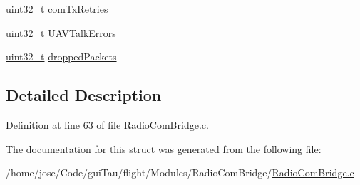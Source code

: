 \begin{DoxyCompactItemize}
\item 
\hyperlink{stdint_8h_a435d1572bf3f880d55459d9805097f62}{uint32\-\_\-t} \hyperlink{group___radio_com_bridge_module_ga392e64420cac274586464b5173287ddd}{com\-Tx\-Retries}
\item 
\hyperlink{stdint_8h_a435d1572bf3f880d55459d9805097f62}{uint32\-\_\-t} \hyperlink{group___radio_com_bridge_module_ga1c4163b0b99110e783fba534b15458c1}{U\-A\-V\-Talk\-Errors}
\item 
\hyperlink{stdint_8h_a435d1572bf3f880d55459d9805097f62}{uint32\-\_\-t} \hyperlink{group___radio_com_bridge_module_gafe94f8af161cf4629a276387f1b0bca6}{dropped\-Packets}
\end{DoxyCompactItemize}


\subsection{Detailed Description}


Definition at line 63 of file Radio\-Com\-Bridge.\-c.



The documentation for this struct was generated from the following file\-:\begin{DoxyCompactItemize}
\item 
/home/jose/\-Code/gui\-Tau/flight/\-Modules/\-Radio\-Com\-Bridge/\hyperlink{_radio_com_bridge_8c}{Radio\-Com\-Bridge.\-c}\end{DoxyCompactItemize}
